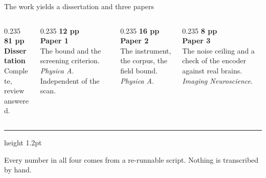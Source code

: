 \documentclass[aspectratio=169,11pt]{beamer}
\begin{document}
\begin{frame}{The work yields a dissertation and three papers}
\vspace{0.8em}
\begin{columns}[T]
\begin{column}{0.235\textwidth}
{\color{midblue}\bfseries 81 pp}\\[0.3em]
\textbf{Dissertation}\\[0.4em]
{\color{slate}\scriptsize Complete, review answered.}
\end{column}
\begin{column}{0.235\textwidth}
{\color{midblue}\bfseries 12 pp}\\[0.3em]
\textbf{Paper 1}\\[0.4em]
{\color{slate}\scriptsize The bound and the screening criterion. \emph{Physica A}.
Independent of the scan.}
\end{column}
\begin{column}{0.235\textwidth}
{\color{midblue}\bfseries 16 pp}\\[0.3em]
\textbf{Paper 2}\\[0.4em]
{\color{slate}\scriptsize The instrument, the corpus, the field bound. \emph{Physica A}.}
\end{column}
\begin{column}{0.235\textwidth}
{\color{midblue}\bfseries 8 pp}\\[0.3em]
\textbf{Paper 3}\\[0.4em]
{\color{slate}\scriptsize The noise ceiling and a check of the encoder against real brains.
\emph{Imaging Neuroscience}.}
\end{column}
\end{columns}

\vspace{1.4em}
{\color{mist}\hrule height 1.2pt}
\vspace{0.9em}

Every number in all four comes from a re-runnable script. Nothing is transcribed by hand.
\end{frame}
\end{document}
